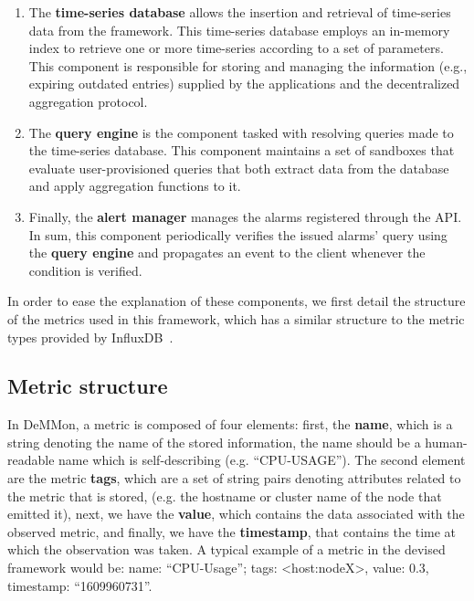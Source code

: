 \begin{enumerate}
    
    \item The \textbf{time-series database} allows the insertion and retrieval of time-series data from the framework. This time-series database employs an in-memory index to retrieve one or more time-series according to a set of parameters. This component is responsible for storing and managing the information (e.g., expiring outdated entries) supplied by the applications and the decentralized aggregation protocol.

    \item The \textbf{query engine} is the component tasked with resolving queries made to the time-series database. This component maintains a set of sandboxes that evaluate user-provisioned queries that both extract data from the database and apply aggregation functions to it.
    
    \item Finally, the \textbf{alert manager} manages the alarms registered through the API. In sum, this component periodically verifies the issued alarms' query using the \textbf{query engine} and propagates an event to the client whenever the condition is verified.
     
\end{enumerate}

In order to ease the explanation of these components, we first detail the structure of the metrics used in this framework, which has a similar structure to the metric types provided by InfluxDB~\cite{influxdb_data_elements}. 

\subsection{Metric  structure}

In DeMMon, a metric is composed of four elements: first, the \textbf{name}, which is a string denoting the name of the stored information, the name should be a human-readable name which is self-describing (e.g. ``CPU-USAGE''). The second element are the metric \textbf{tags}, which are a set of string pairs denoting attributes related to the metric that is stored, (e.g. the hostname or cluster name of the node that emitted it), next, we have the \textbf{value}, which contains the data associated with the observed metric, and finally, we have the  \textbf{timestamp}, that contains the time at which the observation was taken. A typical example of a metric in the devised framework would be: name: ``CPU-Usage''; tags: <host:nodeX>, value: 0.3, timestamp: ``1609960731''.

